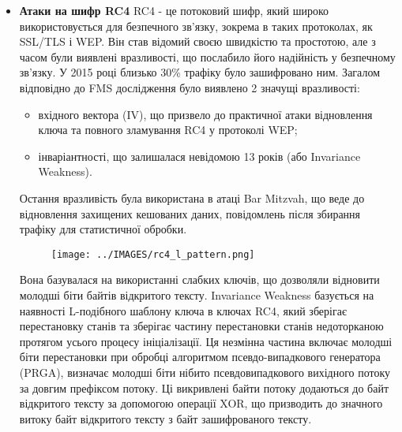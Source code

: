 \begin{itemize}
\item \textbf{Атаки на шифр RC4}
    RC4 - це потоковий шифр, який широко використовується для безпечного зв’язку, зокрема в таких протоколах, як SSL/TLS і WEP. Він став відомий своєю швидкістю та простотою, але з часом були виявлені вразливості, що послабило його надійність у безпечному зв’язку. У 2015 році близько 30\% трафіку було зашифровано ним.
    Загалом відповідно до FMS дослідження було виявлено 2 значущі вразливості:
    \begin{itemize}
        \item вхідного вектора (IV), що призвело до практичної атаки відновлення ключа та повного зламування RC4 у протоколі WEP;
        \item інваріантності, що залишалася невідомою 13 років (або Invariance Weakness).
    \end{itemize}
    
    Остання вразливість була використана в атаці Bar Mitzvah, що веде до відновлення захищених кешованих даних, повідомлень після збирання трафіку для статистичної обробки.
    \begin{figure}[!ht]
        \centering
        \texttt{[image: ../IMAGES/rc4\_l\_pattern.png]}
        \label{weak_keys_rc4}
    \end{figure}
    Вона базувалася на використанні слабких ключів, що дозволяли відновити молодші біти байтів відкритого тексту. Invariance Weakness базується на наявності L-подібного шаблону ключа в ключах RC4, який зберігає перестановку станів та зберігає частину перестановки станів недоторканою протягом усього процесу ініціалізації. Ця незмінна частина включає молодші біти перестановки при обробці алгоритмом псевдо-випадкового генератора (PRGA), визначає молодші біти нібито псевдовипадкового вихідного потоку за довгим префіксом потоку. Ці викривлені байти потоку додаються до байт відкритого тексту за допомогою операції XOR, що призводить до значного витоку байт відкритого тексту з байт зашифрованого тексту.
    

\end{itemize}

